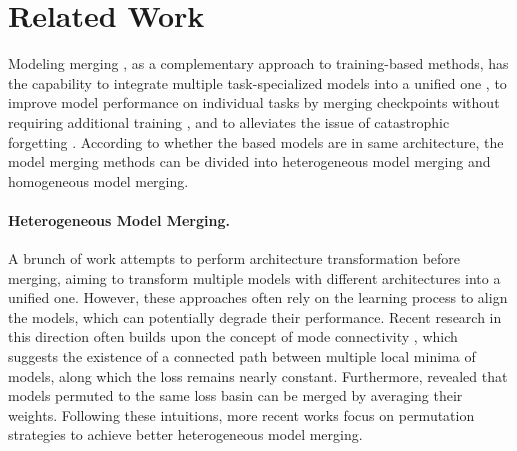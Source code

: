 \section{Related Work}
Modeling merging \citep{merge_survey, mergeKit}, as a complementary approach to training-based methods, has the capability to integrate multiple task-specialized models into a unified one \citep{model_soup, zipit, re-basin, dare}, to improve model performance on individual tasks by merging checkpoints without requiring additional training \citep{ties_merging, task_arithmetic}, and to alleviates the issue of catastrophic forgetting \citep{mitigating_cf}.
According to whether the based models are in same architecture, the model merging methods can be divided into heterogeneous model merging and homogeneous model merging.

\paragraph{Heterogeneous Model Merging.}
A brunch of work \citep{DBLP:conf/eccv/AvrahamiLF22,DBLP:conf/icassp/NguyenNNPBH23} attempts to perform architecture transformation before merging, aiming to transform multiple models with different architectures into a unified one. However, these approaches often rely on the learning process to align the models, which can potentially degrade their performance.
Recent research in this direction often builds upon the concept of mode connectivity \citep{DBLP:conf/iclr/FreemanB17, DBLP:conf/icml/FrankleD0C20, DBLP:conf/nips/TatroCDMSL20}, which suggests the existence of a connected path between multiple local minima of models, along which the loss remains nearly constant. Furthermore, \citet{DBLP:conf/iclr/EntezariSSN22} revealed that models permuted to the same loss basin can be merged by averaging their weights. Following these intuitions, more recent works \citep{re-basin,repair,zipit} focus on permutation strategies to achieve better heterogeneous model merging.

